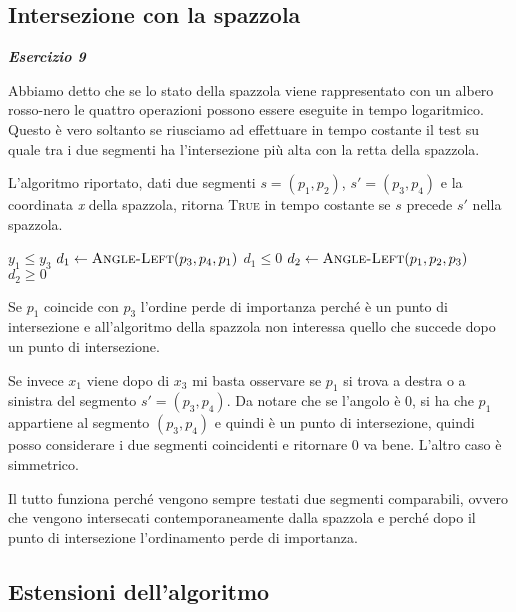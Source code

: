 \subsection{Intersezione con la spazzola}

\textit{\textbf{Esercizio 9}} 

Abbiamo detto che se lo stato della spazzola viene rappresentato con un albero rosso-nero le quattro operazioni possono essere eseguite in tempo logaritmico.
Questo è vero soltanto se riusciamo ad effettuare in tempo costante il test su quale tra i due segmenti ha l'intersezione più alta con la retta della spazzola.

L'algoritmo riportato, dati due segmenti $s = (p_1,p_2)$, $s' = (p_3, p_4)$ e la coordinata \textit{x} della spazzola, ritorna \textsc{True} in tempo costante se $s$ precede $s'$ nella spazzola.

\begin{breakablealgorithm}
	\begin{algorithmic}[1]
				\State \Return $y_1 \leq y_3$ 
			\EndIf
				\State $d_1 \gets \textsc{Angle-Left}(p_3,p_4,p_1)$
				\State \Return $d_1 \leq 0$
			\Else {}
				\State $d_2 \gets \textsc{Angle-Left}(p_1,p_2,p_3)$
				\State \Return $d_2 \geq 0$
			\EndIf
		\EndFunction
	\end{algorithmic}
\end{breakablealgorithm}

Se $p_1$ coincide con $p_3$ l'ordine perde di importanza perché è un punto di intersezione e all'algoritmo della spazzola non interessa quello che succede dopo un punto di intersezione.

Se invece $x_1$ viene dopo di $x_3$ mi basta osservare se $p_1$ si trova a destra o a sinistra del segmento $s' = (p_3,p_4)$. 
Da notare che se l'angolo è 0, si ha che $p_1$ appartiene al segmento $(p_3,p_4)$ e quindi è un punto di intersezione, quindi posso considerare i due segmenti coincidenti e ritornare 0 va bene. L'altro caso è simmetrico.

Il tutto funziona perché vengono sempre testati due segmenti comparabili, ovvero che vengono intersecati contemporaneamente dalla spazzola e perché dopo il punto di intersezione l'ordinamento perde di importanza.

\subsection{Estensioni dell'algoritmo}


